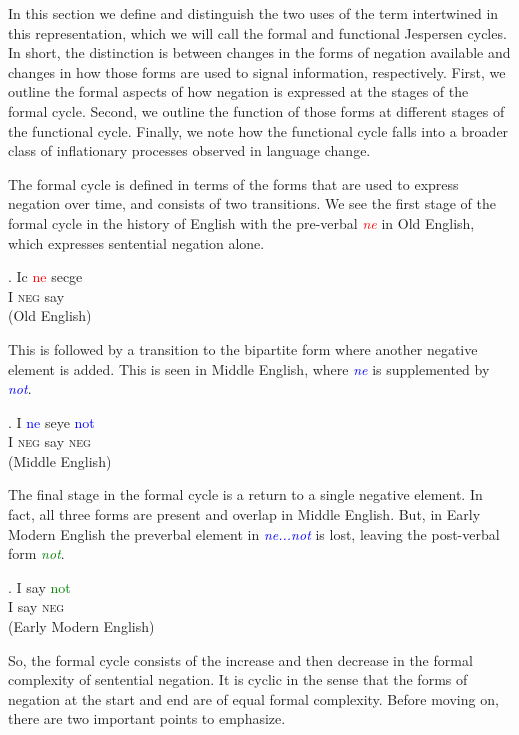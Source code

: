 \documentclass[linguex]{sp}
\theoremstyle{definition} \newtheorem{definition}{Definition}
\begin{document}
In this section we define and distinguish the two uses of the term intertwined in this representation, which we will call the formal and functional Jespersen cycles. In short, the distinction is between changes in the forms of negation available and changes in how those forms are used to signal information, respectively.  First, we outline the formal aspects of how negation is expressed at the stages of the formal cycle. Second, we outline the function of those forms at different stages of the functional cycle. Finally, we note how the functional cycle falls into a broader class of inflationary processes observed in language change.

The formal cycle is defined in terms of the forms that are used to express negation over time, and consists of two transitions. We see the first stage of the formal cycle in the history of English with the pre-verbal \emph{\textcolor{red}{ne}} in Old English, which expresses sentential negation alone.

\exg. Ic \textcolor{red}{ne} secge\\
      I \textsc{neg} say\\
      (Old English)

This is followed by a transition to the bipartite form where another negative element is added. This is seen in Middle English, where \emph{\textcolor{blue}{ne}} is supplemented by \emph{\textcolor{blue}{not}}.

\exg. I \textcolor{blue}{ne} seye \textcolor{blue}{not}\\
      I \textsc{neg} say \textsc{neg}\\
      (Middle English)

The final stage in the formal cycle is a return to a single negative element. In fact, all three forms are present and overlap in Middle English. But, in Early Modern English the preverbal element in \emph{\textcolor{blue}{ne...not}} is lost, leaving the post-verbal form \emph{\textcolor{green}{not}}. 

\exg. I say \textcolor{green}{not}\\
      I say \textsc{neg}\\
      (Early Modern English)

So, the formal cycle consists of the increase and then decrease in the formal complexity of sentential negation. It is cyclic in the sense that the forms of negation at the start and end are of equal formal complexity. Before moving on, there are two important points to emphasize.
\end{document}
